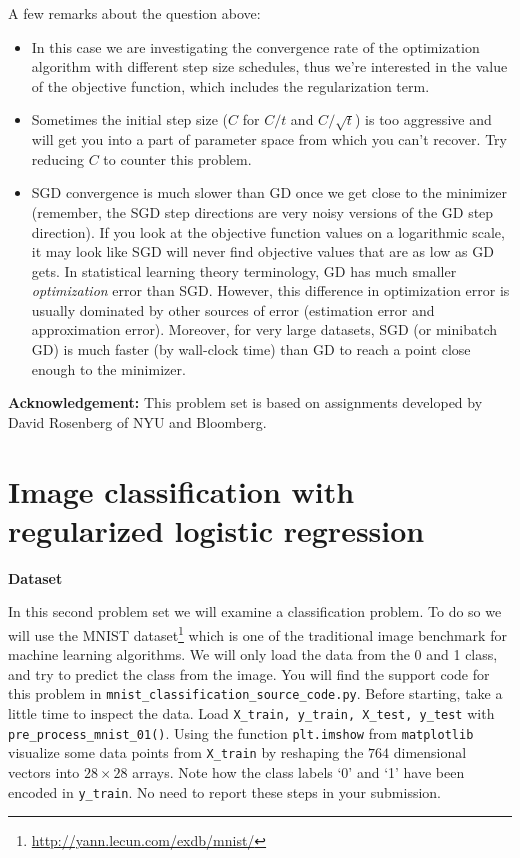 \documentclass{article}
\begin{document}
A few remarks about the question above:
\begin{itemize}
\item In this case we are investigating the convergence rate of
the optimization algorithm with different step size schedules, thus
we're interested in the value of the objective function, which includes
the regularization term.
\item Sometimes the initial step size ($C$
for $C/t$ and $C/\sqrt{t}$) is too aggressive and will get you into
a part of parameter space from which you can't recover. Try reducing $C$ to counter this problem. 
\item SGD
convergence is much slower than GD once we get close to the minimizer
(remember, the SGD step directions are very noisy versions of the
GD step direction). If you look at the objective function values on
a logarithmic scale, it may look like SGD will never find objective
values that are as low as GD gets. In statistical learning theory terminology, GD has much smaller \emph{optimization} error than SGD. However,
this difference in optimization error is usually dominated by other
sources of error (estimation error and approximation error). Moreover,
for very large datasets, SGD (or minibatch GD) is much faster (by
wall-clock time) than GD to reach a point close enough
to the minimizer. 
\end{itemize}

{\bf Acknowledgement:} This problem set is based on assignments developed by David Rosenberg of NYU and Bloomberg.


\newpage 

\section{\large Image classification with regularized logistic regression}


{\color{nyupurple} \large \bf Dataset}  

In this second problem set we will examine a classification problem. To do so we will use the MNIST dataset\footnote{\url{http://yann.lecun.com/exdb/mnist/}} which is one of the traditional image benchmark for machine learning algorithms. We will only load the data from the 0 and 1 class, and try to predict the class from the image. You will find the support code for this problem in \texttt{mnist\_classification\_source\_code.py}.
Before starting, take a little time to inspect the data. Load \texttt{X\_train, y\_train, X\_test, y\_test} with \texttt{pre\_process\_mnist\_01()}. Using the function \texttt{plt.imshow} from \texttt{matplotlib} visualize some data points from \texttt{X\_train} by reshaping the $764$ dimensional vectors into $28 \times 28$ arrays. Note how the class labels `0' and `1' have been encoded in \texttt{y\_train}. No need to report these steps in your submission.
\end{document}
